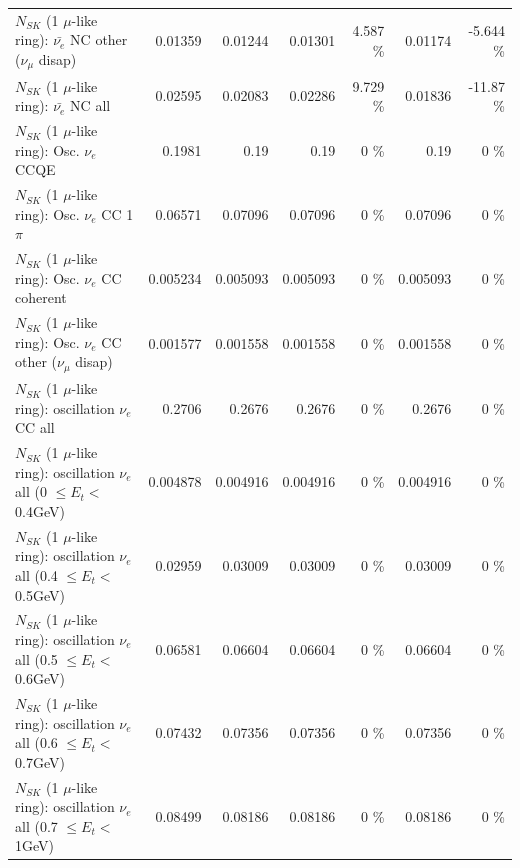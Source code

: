 \begin{table}
\begin{tabular}{| l | r | r | r  r | r  r |}
          $N_{SK}$ (1 $\mu$-like ring): $\bar{\nu_e}$ NC other ($\nu_\mu$ disap) &         0.01359 &         0.01244 &         0.01301 &    4.587 \%  &         0.01174 &   -5.644 \%  \\ 
                            $N_{SK}$ (1 $\mu$-like ring): $\bar{\nu_{e}}$ NC all &         0.02595 &         0.02083 &         0.02286 &    9.729 \%  &         0.01836 &   -11.87 \%  \\ 
\hline
\hline
\hline
                                 $N_{SK}$ (1 $\mu$-like ring): Osc. $\nu_e$ CCQE &          0.1981 &            0.19 &            0.19 &        0 \%  &            0.19 &        0 \%  \\ 
                            $N_{SK}$ (1 $\mu$-like ring): Osc. $\nu_e$ CC 1$\pi$ &         0.06571 &         0.07096 &         0.07096 &        0 \%  &         0.07096 &        0 \%  \\ 
                          $N_{SK}$ (1 $\mu$-like ring): Osc. $\nu_e$ CC coherent &        0.005234 &        0.005093 &        0.005093 &        0 \%  &        0.005093 &        0 \%  \\ 
           $N_{SK}$ (1 $\mu$-like ring): Osc. $\nu_e$ CC other ($\nu_\mu$ disap) &        0.001577 &        0.001558 &        0.001558 &        0 \%  &        0.001558 &        0 \%  \\ 
                        $N_{SK}$ (1 $\mu$-like ring): oscillation $\nu_e$ CC all &          0.2706 &          0.2676 &          0.2676 &        0 \%  &          0.2676 &        0 \%  \\ 
\hline
$N_{SK}$ (1 $\mu$-like ring): oscillation $\nu_{e}$ all (0 $\leq E_{t} <$ 0.4GeV) &        0.004878 &        0.004916 &        0.004916 &        0 \%  &        0.004916 &        0 \%  \\ 
$N_{SK}$ (1 $\mu$-like ring): oscillation $\nu_{e}$ all (0.4 $\leq E_{t} <$ 0.5GeV) &         0.02959 &         0.03009 &         0.03009 &        0 \%  &         0.03009 &        0 \%  \\ 
$N_{SK}$ (1 $\mu$-like ring): oscillation $\nu_{e}$ all (0.5 $\leq E_{t} <$ 0.6GeV) &         0.06581 &         0.06604 &         0.06604 &        0 \%  &         0.06604 &        0 \%  \\ 
$N_{SK}$ (1 $\mu$-like ring): oscillation $\nu_{e}$ all (0.6 $\leq E_{t} <$ 0.7GeV) &         0.07432 &         0.07356 &         0.07356 &        0 \%  &         0.07356 &        0 \%  \\ 
$N_{SK}$ (1 $\mu$-like ring): oscillation $\nu_{e}$ all (0.7 $\leq E_{t} <$ 1GeV) &         0.08499 &         0.08186 &         0.08186 &        0 \%  &         0.08186 &        0 \%  \\ 

\end{tabular}
\end{table}
